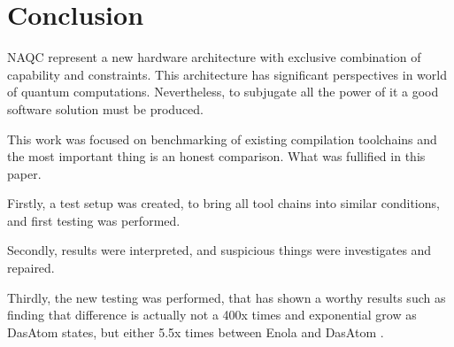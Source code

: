 
\chapter{Conclusion}\label{chapter:conclusion}
\ac{NAQC} represent a new hardware architecture with exclusive combination of capability and constraints.
This architecture has significant perspectives in world of quantum computations. 
Nevertheless, to subjugate all the power of it a good software solution must be produced.

This work was focused on benchmarking of existing compilation toolchains 
and the most important thing is an honest comparison. What was fullified in this paper.

Firstly, a test setup was created, to bring all tool chains into similar conditions, and first testing was performed.

Secondly, results were interpreted, and suspicious things were investigates and repaired.

Thirdly, the new testing was performed, that has shown a worthy results 
such as finding that difference is actually not a 400x times and exponential grow as DasAtom \parencite{huang2025dasatomdivideandshuttleatomapproach} states, 
but either 5.5x times between Enola and DasAtom \parencite{Emil_Khusainov_Bachelor_GIT}. 
